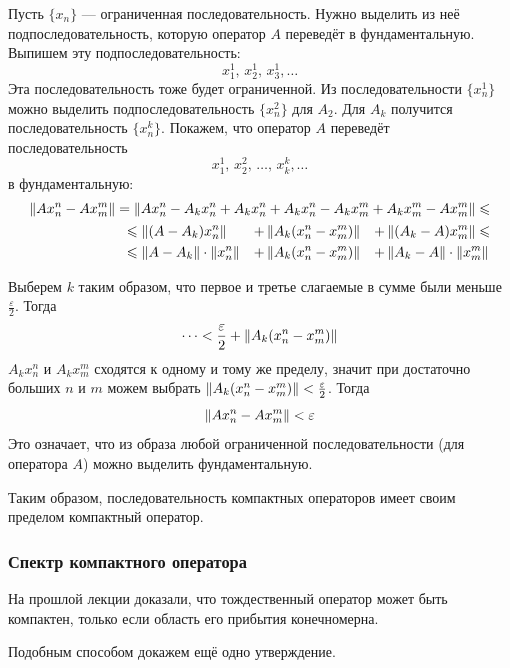 \documentclass[12pt]{article}
\begin{document}
\begin{enumerate}
				Пусть $\{x_n\}$ --- ограниченная последовательность. Нужно выделить из неё подпоследовательность, которую оператор $A$ 
				переведёт в фундаментальную. Выпишем эту подпоследовательность:
				$$x_1^1,\,x_2^1,\,x_3^1,\dots$$
				Эта последовательность тоже будет ограниченной. Из последовательности $\{x^1_n\}$ можно выделить подпоследовательность 
				$\{x^2_n\}$ для $A_2$. Для $A_k$ получится последовательность $\{x^k_n\}$. Покажем, что оператор $A$ переведёт 
				последовательность
				$$x^1_1,\,x^2_2,\,\dots,\,x^k_k,\dots$$
				в фундаментальную:
				\begin{align*}
					\left\| Ax_n^n - Ax_m^m \right\| = \left\| Ax_n^n - A_kx^n_n + A_kx_n^n + A_kx_n^n - A_kx_m^m + A_kx_m^m - Ax_m^m \right\| \leqslant \\
					\begin{aligned}
						&\leqslant \left\| (A-A_k)x_n^n \right\| &+ &\left\| A_k(x_n^n - x_m^m) \right\| &+ &\left\| (A_k - A)x_m^m \right\| \leqslant \\
						&\leqslant \left\| A-A_k \right\|\cdot\left\| x_n^n \right\| &+ &\left\| A_k(x_n^n - x_m^m) \right\| &+ &\left\| A_k - A \right\| \cdot\left\| x_m^m \right\|
					\end{aligned}
				\end{align*}
		
				Выберем $k$ таким образом, что первое и третье слагаемые в сумме были меньше $\frac{\varepsilon}{2}$. Тогда 
				$$\dots < \frac{\varepsilon}{2} + \left\| A_k(x_n^n - x_m^m) \right\|$$
				$A_k x_n^n$ и $A_k x_m^m$ сходятся к одному и тому же пределу, значит при достаточно больших $n$ и $m$ можем выбрать
				$\left\| A_k(x_n^n - x_m^m) \right\| < \frac{\varepsilon}{2}$. Тогда
				$$\left\| Ax_n^n - Ax_m^m \right\| < \varepsilon$$
				Это означает, что из образа любой ограниченной последовательности (для оператора $A$) можно выделить фундаментальную.
		
				Таким образом, последовательность компактных операторов имеет своим пределом компактный оператор.
			\end{enumerate}


		\subsubsection{Спектр компактного оператора}

			На прошлой лекции доказали, что тождественный оператор может быть компактен, только если область его прибытия конечномерна.

			Подобным способом докажем ещё одно утверждение.
	
\end{document}
